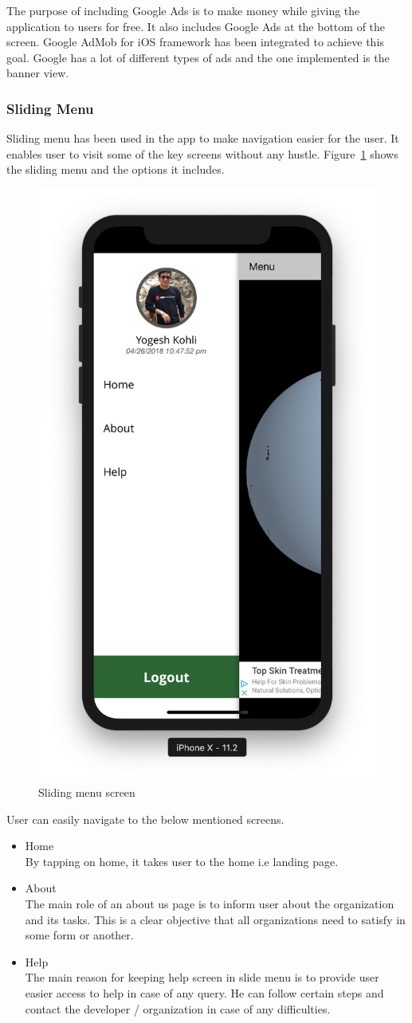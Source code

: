    The purpose of including Google Ads is to make money while giving the application to users for free. It also includes Google Ads at the bottom of the screen. Google AdMob for \gls{iOS} framework has been integrated to achieve this goal. Google has a lot of different types of ads and the one implemented is the banner view.

\subsubsection{Sliding Menu}

Sliding menu has been used in the app to make navigation easier for the user. It enables user to visit some of the key screens without any hustle. Figure~\ref{fig:side_menu_ch4} shows the sliding menu and the options it includes.

    \begin{figure}[H]
            \centering
            \includegraphics[width=0.25\linewidth]{figures/ch4/side_menu.png}
            \caption{\label{fig:side_menu_ch4} Sliding menu screen}
    \end{figure}

    User can easily navigate to the below mentioned screens.

    \begin{itemize}
    \item Home \\
    By tapping on home, it takes user to the home i.e landing page.
    
        \item About \\
            The main role of an about us page is to inform user about the organization and its tasks. This is a clear objective that all organizations need to satisfy in some form or another.
    
         \item Help \\
            The main reason for keeping help screen in slide menu is to provide user easier access to help in case of any query. He can follow certain steps and contact the developer / organization in case of any difficulties.
            
    \end{itemize}

